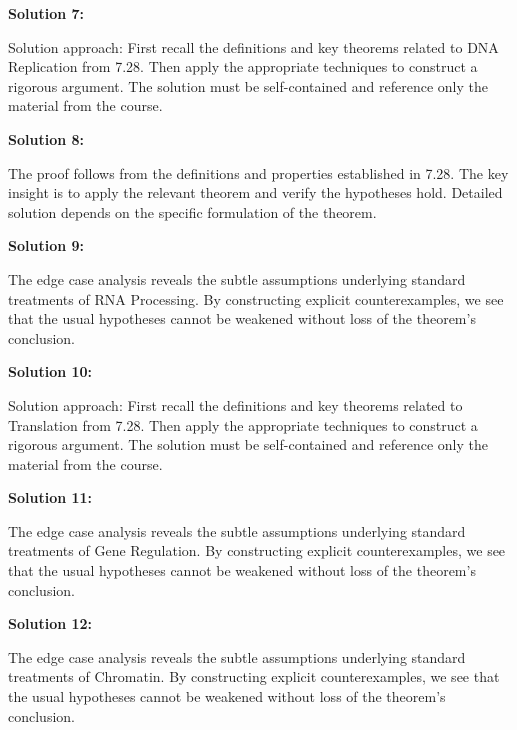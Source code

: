 \documentclass[12pt,a4paper]{exam}
\begin{document}
\vspace{0.5cm}

\textbf{Solution 7:}

Solution approach: First recall the definitions and key theorems related to DNA Replication from 7.28. Then apply the appropriate techniques to construct a rigorous argument. The solution must be self-contained and reference only the material from the course.

\vspace{0.5cm}

\textbf{Solution 8:}

The proof follows from the definitions and properties established in 7.28. The key insight is to apply the relevant theorem and verify the hypotheses hold. Detailed solution depends on the specific formulation of the theorem.

\vspace{0.5cm}

\textbf{Solution 9:}

The edge case analysis reveals the subtle assumptions underlying standard treatments of RNA Processing. By constructing explicit counterexamples, we see that the usual hypotheses cannot be weakened without loss of the theorem's conclusion.

\vspace{0.5cm}

\textbf{Solution 10:}

Solution approach: First recall the definitions and key theorems related to Translation from 7.28. Then apply the appropriate techniques to construct a rigorous argument. The solution must be self-contained and reference only the material from the course.

\vspace{0.5cm}

\textbf{Solution 11:}

The edge case analysis reveals the subtle assumptions underlying standard treatments of Gene Regulation. By constructing explicit counterexamples, we see that the usual hypotheses cannot be weakened without loss of the theorem's conclusion.

\vspace{0.5cm}

\textbf{Solution 12:}

The edge case analysis reveals the subtle assumptions underlying standard treatments of Chromatin. By constructing explicit counterexamples, we see that the usual hypotheses cannot be weakened without loss of the theorem's conclusion.
\end{document}
